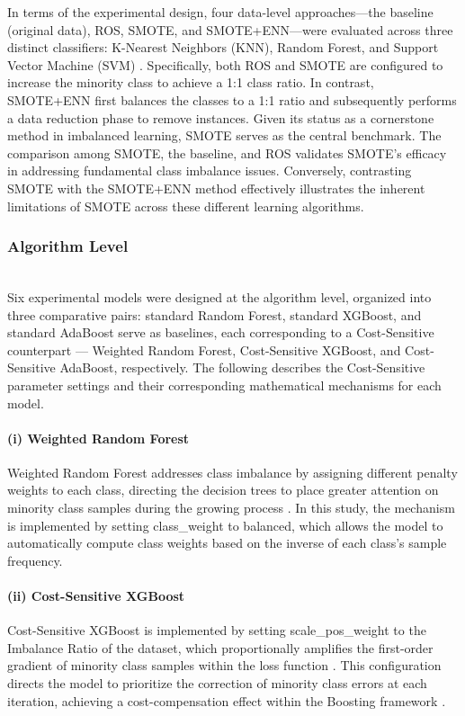 \documentclass[sigconf]{acmart}
\begin{document}
In terms of the experimental design, four data-level approaches---the baseline (original data), ROS, SMOTE, and SMOTE+ENN---were evaluated across three distinct classifiers: K-Nearest Neighbors (KNN), Random Forest, and Support Vector Machine (SVM) \cite{32}. Specifically, both ROS and SMOTE are configured to increase the minority class to achieve a 1:1 class ratio. In contrast, SMOTE+ENN first balances the classes to a 1:1 ratio and subsequently performs a data reduction phase to remove instances. Given its status as a cornerstone method in imbalanced learning, SMOTE serves as the central benchmark. The comparison among SMOTE, the baseline, and ROS validates SMOTE's efficacy in addressing fundamental class imbalance issues. Conversely, contrasting SMOTE with the SMOTE+ENN method effectively illustrates the inherent limitations of SMOTE across these different learning algorithms.  

\subsubsection{Algorithm Level}~\\

Six experimental models were designed at the algorithm level, organized into three comparative pairs: standard Random Forest, standard XGBoost, and standard AdaBoost serve as baselines, each corresponding to a Cost-Sensitive counterpart --- Weighted Random Forest, Cost-Sensitive XGBoost, and Cost-Sensitive AdaBoost, respectively. The following describes the Cost-Sensitive parameter settings and their corresponding mathematical mechanisms for each model. 

\paragraph{(i) Weighted Random Forest}
Weighted Random Forest addresses class imbalance by assigning different penalty weights to each class, directing the decision trees to place greater attention on minority class samples during the growing process \cite{33}. In this study, the mechanism is implemented by setting class\_weight to balanced, which allows the model to automatically compute class weights based on the inverse of each class's sample frequency. 

\paragraph{(ii) Cost-Sensitive XGBoost}
 Cost-Sensitive XGBoost is implemented by setting scale\_pos\_weight to the Imbalance Ratio of the dataset, which proportionally amplifies the first-order gradient of minority class samples within the loss function \cite{21}. This configuration directs the model to prioritize the correction of minority class errors at each iteration, achieving a cost-compensation effect within the Boosting framework \cite{18}. 
\end{document}
